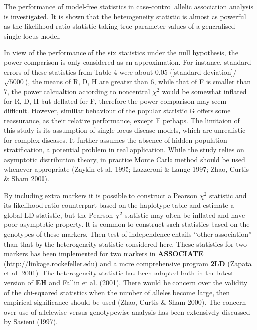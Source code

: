 The performance of model-free statistics in case-control allelic association
analysis is investigated.  It is shown that the heterogeneity statistic is
almost as powerful as the likelihood ratio statistic taking true parameter
values of a generalised single locus model.

In view of the performance of the six statistics under the null hypothesis, the
power comparison is only considered as an approximation.  For instance,
standard errors of these statistics from Table 4 were about 0.05 ([standard
deviation]/$\sqrt{5000}$), the means of R, D, H are greater than 6, while that
of F is smaller than 7, the power calcualtion according to noncentral $\chi^2$
would be somewhat inflated for R, D, H but deflated for F, therefore the power
comparison may seem difficult.  However, similiar behaviour of the popular
statistic G offers some reassurance, as their relative performance, except F 
perhaps.  The limitaion of this study is its assumption of single locus disease 
models, which are unrealistic for complex diseases.  It further assumes the 
absence of hidden population stratification, a potential problem in real 
application.  While the study relies on asymptotic distribution theory, in 
practice Monte Carlo method should be used whenever appropriate (Zaykin et al. 
1995; Lazzeroni \& Lange 1997; Zhao, Curtis \& Sham 2000).

By including extra markers it is possible to construct a Pearson $\chi^2$
statistic and its likelihood ratio counterpart based on the haplotype table and
estimate a global LD statistic, but the Pearson $\chi^2$ statistic may often be
inflated and have poor asymptotic property.  It is common to construct such
statistics based on the genotypes of these markers.  Then test of independence
entails ``other association'' than that by the heterogeneity statistic
considered here.  These statistics for two markers has been implemented for two
markers in {\bf ASSOCIATE} (http://linkage.rockefeller.edu) and a more
comprehensive program {\bf 2LD} (Zapata et al.  2001).  The heterogeneity
statistic has been adopted both in the latest version of {\bf EH} and Fallin et
al.  (2001).  There would be concern over the validity of the chi-squared
statistics when the number of alleles become large, then empirical significance
should be used (Zhao, Curtis \& Sham 2000).  The concern over use of allelewise
versus genotypewise analysis has been extensively discussed by Sasieni (1997).

